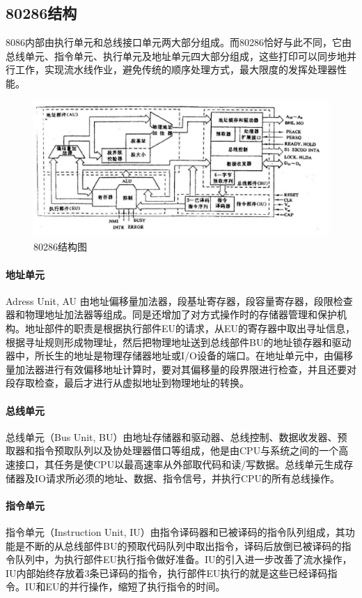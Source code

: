 \documentclass[12pt]{article}
\begin{document}
\subsection{80286结构}
8086内部由执行单元和总线接口单元两大部分组成。而80286恰好与此不同，它由总线单元、指令单元、执行单元及地址单元四大部分组成，这些打印可以同步地并行工作，实现流水线作业，避免传统的顺序处理方式，最大限度的发挥处理器性能。
\begin{figure}[htbp]
\centering
\includegraphics[scale=0.35]{fig/15.png}
\caption{80286结构图}
\label{fig:80286 component}
\end{figure}
\paragraph{地址单元}
Adress Unit, AU 由地址偏移量加法器，段基址寄存器，段容量寄存器，段限检查器和物理地址加法器等组成。同是还增加了对方式操作时的存储器管理和保护机构。地址部件的职责是根据执行部件EU的请求，从EU的寄存器中取出寻址信息，根据寻址规则形成物理址，然后把物理地址送到总线部件BU的地址锁存器和驱动器中，所长生的地址是物理存储器地址或I/O设备的端口。在地址单元中，由偏移量加法器进行有效偏移地址计算时，要对其偏移量的段界限进行检查，并且还要对段存取检查，最后才进行从虚拟地址到物理地址的转换。
\paragraph{总线单元}
总线单元（Bus Unit, BU）由地址存储器和驱动器、总线控制、数据收发器、预取器和指令预取队列以及协处理器借口等组成，他是由CPU与系统之间的一个高速接口，其任务是使CPU以最高速率从外部取代码和读/写数据。总线单元生成存储器及IO请求所必须的地址、数据、指令信号，并执行CPU的所有总线操作。
\paragraph{指令单元}
指令单元（Instruction Unit, IU）由指令译码器和已被译码的指令队列组成，其功能是不断的从总线部件BU的预取代码队列中取出指令，译码后放倒已被译码的指令队列中，为执行部件EU执行指令做好准备。IU的引入进一步改善了流水操作，IU内部始终存放着3条已译码的指令，执行部件EU执行的就是这些已经译码指令。IU和EU的并行操作，缩短了执行指令的时间。
\end{document}
